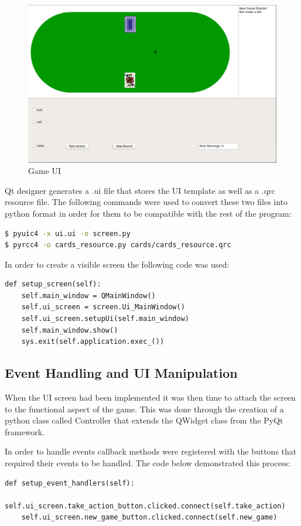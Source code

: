\begin{figure}[ht]
    \includegraphics[scale=.4]{images/UI_screenshot.png}
    \caption{Game UI}
\end{figure}

Qt designer generates a .ui file that stores the UI template as well as a .qrc resource file.
The following commands were used to convert these two files into python format in order for them
to be compatible with the rest of the program:
\begin{lstlisting}[language=bash]
$ pyuic4 -x ui.ui -o screen.py
$ pyrcc4 -o cards_resource.py cards/cards_resource.qrc
\end{lstlisting}

In order to create a visible screen the following code was used:

\begin{lstlisting}[style=Python]
def setup_screen(self):
    self.main_window = QMainWindow()
    self.ui_screen = screen.Ui_MainWindow()
    self.ui_screen.setupUi(self.main_window)
    self.main_window.show()
    sys.exit(self.application.exec_())
\end{lstlisting}

\subsection{Event Handling and UI Manipulation}\label{subsec:eventHandling}
When the UI screen had been implemented it was then time to attach the screen to the
functional aspect of the game.
This was done through the creation of a python class called Controller that extends the QWidget
class from the PyQt framework.

In order to handle events callback methods were registered with the buttons that required their events to be handled.
The code below demonstrated this process:
\begin{lstlisting}[style=Python]
def setup_event_handlers(self):
    self.ui_screen.take_action_button.clicked.connect(self.take_action)
    self.ui_screen.new_game_button.clicked.connect(self.new_game)
\end{lstlisting}

